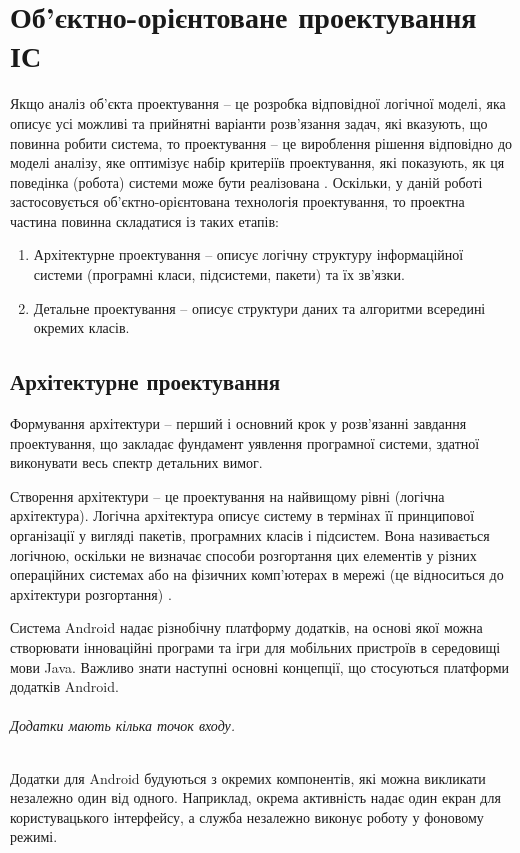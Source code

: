 \documentclass[../main.tex]{subfiles}
\begin{document}
\chapter{Об’єктно-орієнтоване проектування ІС}

Якщо аналіз об’єкта проектування – це розробка відповідної логічної моделі, яка описує усі можливі та прийнятні варіанти розв’язання задач, які вказують, що повинна робити система, то проектування – це вироблення рішення відповідно до моделі аналізу, яке оптимізує набір критеріїв проектування, які  показують, як ця поведінка (робота) системи може бути реалізована \cite{diploma_guidelines}.
Оскільки, у даній роботі застосовується об’єктно-\linebreak[0]орієнтована технологія проектування, то проектна частина повинна складатися із таких етапів:

\begin{enumerate}
	\item Архітектурне проектування – описує логічну структуру інформаційної системи (програмні класи, підсистеми,  пакети) та їх зв’язки.
	\item Детальне проектування – описує структури даних та алгоритми всередині окремих класів. 
\end{enumerate}

\section{Архітектурне проектування}
Формування архітектури – перший і основний крок у розв’язанні завдання проектування, що закладає фундамент уявлення програмної системи, здатної виконувати весь спектр детальних вимог. \cite{diploma_guidelines2}

Створення архітектури – це проектування на найвищому рівні (логічна архітектура). Логічна архітектура описує систему в термінах її принципової організації у вигляді пакетів, програмних класів і підсистем. Вона називається логічною, оскільки не визначає способи розгортання цих елементів у різних операційних системах або на фізичних комп’ютерах в мережі (це відноситься до архітектури розгортання) \cite{diploma_guidelines}.

Система Android надає різнобічну платформу додатків, на основі якої можна створювати інноваційні програми та ігри для мобільних пристроїв в середовищі мови Java. Важливо знати наступні основні концепції, що стосуються платформи додатків Android.

\subparagraph{Додатки мають кілька точок входу.}
Додатки для Android будуються з окремих компонентів, які можна викликати незалежно один від одного. Наприклад, окрема активність надає один екран для користувацького інтерфейсу, а служба незалежно виконує роботу у фоновому режимі.
	
\end{document}
